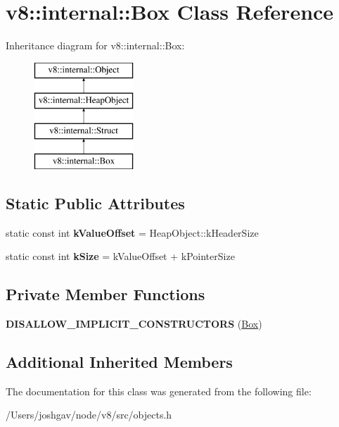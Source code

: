\hypertarget{classv8_1_1internal_1_1_box}{}\section{v8\+:\+:internal\+:\+:Box Class Reference}
\label{classv8_1_1internal_1_1_box}
Inheritance diagram for v8\+:\+:internal\+:\+:Box\+:\begin{figure}[H]
\begin{center}
\leavevmode
\includegraphics[height=4.000000cm]{classv8_1_1internal_1_1_box}
\end{center}
\end{figure}
\subsection*{Static Public Attributes}
\begin{DoxyCompactItemize}
\item 
static const int {\bfseries k\+Value\+Offset} = Heap\+Object\+::k\+Header\+Size\hypertarget{classv8_1_1internal_1_1_box_a703da82ac4f3b707516cc087c41a45a8}{}\label{classv8_1_1internal_1_1_box_a703da82ac4f3b707516cc087c41a45a8}

\item 
static const int {\bfseries k\+Size} = k\+Value\+Offset + k\+Pointer\+Size\hypertarget{classv8_1_1internal_1_1_box_ad798c06e045dacc8a43dec11e06e42a6}{}\label{classv8_1_1internal_1_1_box_ad798c06e045dacc8a43dec11e06e42a6}

\end{DoxyCompactItemize}
\subsection*{Private Member Functions}
\begin{DoxyCompactItemize}
\item 
{\bfseries D\+I\+S\+A\+L\+L\+O\+W\+\_\+\+I\+M\+P\+L\+I\+C\+I\+T\+\_\+\+C\+O\+N\+S\+T\+R\+U\+C\+T\+O\+RS} (\hyperlink{classv8_1_1internal_1_1_box}{Box})\hypertarget{classv8_1_1internal_1_1_box_a3216ae60a428e6eaf8d3af4d56b0b4e2}{}\label{classv8_1_1internal_1_1_box_a3216ae60a428e6eaf8d3af4d56b0b4e2}

\end{DoxyCompactItemize}
\subsection*{Additional Inherited Members}


The documentation for this class was generated from the following file\+:\begin{DoxyCompactItemize}
\item 
/\+Users/joshgav/node/v8/src/objects.\+h\end{DoxyCompactItemize}
